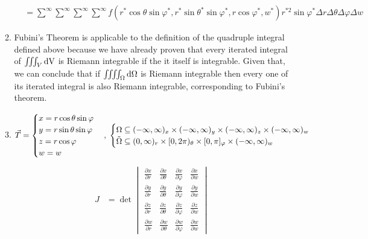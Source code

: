 \documentclass[12pt]{article}
\begin{document}
\begin{enumerate}
\begin{enumerate}
\begin{align*}
            &=\boxed{\sum^\infty\sum^\infty\sum^\infty\sum^\infty f(r^*\cos\theta\sin\varphi^*,r^*\sin\theta^*\sin\varphi^*,r\cos\varphi^*, w^*)r^{*2}\sin\varphi^*\Delta r\Delta\theta\Delta\varphi\Delta w}
        \end{align*} 
        \item Fubini's Theorem is applicable to the definition of the quadruple integral defined above because we have already proven that every iterated integral of $\iiint_V {\rm dV}$ is Riemann integrable if the it itself is integrable. Given that, we can conclude that if $\iiiint_\Omega{\rm d\Omega}$ is Riemann integrable then every one of its iterated integral is also Riemann integrable, corresponding to Fubini's theorem.
        \newpage
        \item 
        \begin{equation*}
        \Vec{T}=
            \begin{cases}
                x=r\cos\theta\sin\varphi\\
                y=r\sin\theta\sin\varphi\\
                z=r\cos\varphi\\
                w=w
            \end{cases},\;
            \begin{cases}
                \Omega \subseteq (-\infty,\infty)_x\times(-\infty,\infty)_y\times(-\infty,\infty)_z\times(-\infty,\infty)_w\\
                \Tilde{\Omega} \subseteq (0,\infty)_r\times[0, 2\pi)_\theta\times[0,\pi]_\varphi\times(-\infty,\infty)_w
            \end{cases}
        \end{equation*}
        \begin{align*}
            J&=
            \det\begin{vmatrix}
                \frac{\partial x}{\partial r} & \frac{\partial x}{\partial \theta} & \frac{\partial x}{\partial \varphi} & \frac{\partial x}{\partial w}\\
                \frac{\partial y}{\partial r} & \frac{\partial y}{\partial \theta} & \frac{\partial y}{\partial \varphi} & \frac{\partial y}{\partial w}\\
                \frac{\partial z}{\partial r} & \frac{\partial z}{\partial \theta} & \frac{\partial z}{\partial \varphi} & \frac{\partial z}{\partial w}\\
                \frac{\partial w}{\partial r} & \frac{\partial w}{\partial \theta} & \frac{\partial w}{\partial \varphi} & \frac{\partial w}{\partial w}

\end{vmatrix}
\end{align*}
\end{enumerate}
\end{enumerate}
\end{document}
